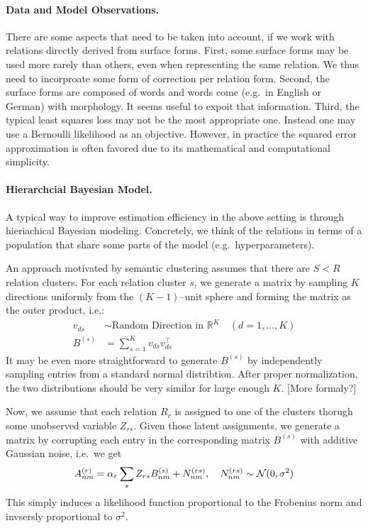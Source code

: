 \documentclass{article}
\renewcommand{\Re}{{\mathbb R}}
\begin{document}
\paragraph{Data and Model Observations.} There are some aspects that need to be taken into account, if we work with relations directly derived from surface forms. First, some surface forms may be used more rarely than others, even when representing the same relation. We thus need to incorproate some form of correction per relation form. Second, the surface forms are composed of words and words come (e.g.~in English or German) with morphology. It seems useful to expoit that information. Third, the typical least squares loss may not be the most appropriate one. Instead one may use a Bernoulli likelihood as an objective. However, in practice the squared error approximation is often favored due to its mathematical and computational simplicity. 

\paragraph{Hierarchcial Bayesian Model.} 

A typical way to improve estimation efficiency in the above setting is through hieriachical Bayesian modeling. Concretely, we think of the relations in terms of a population that share some parts of the model (e.g.~hyperparameters).  

An approach motivated by semantic clustering assumes that there are $S < R$ relation clusters. For each relation cluster $s$, we generate a matrix by sampling $K$ directions uniformly from the $(K-1)$--unit sphere and forming the matrix as the outer product, i.e.:
\begin{align}
v_{ds} & \sim \text{Random Direction in $\Re^K$} \quad (d=1,\dots,K) \\
B^{(s)} & = \sum_{s=1}^K v_{ds} v_{ds}^\top
\end{align}
It may be even more straightforward to generate $B^{(s)}$ by independently sampling entries from a standard normal distribtion. After proper normalization, the two distributions should be very similar for large enough $K$.  [More formaly?]

Now, we assume that each relation $R_r$ is assigned to one of the clusters thorugh some unobserved variable $Z_{rs}$. Given those latent assignments, we generate a matrix by corrupting each entry in the corresponding matrix $B^{(s)}$ with additive Gaussian noise, i.e.~we get 
\begin{align}
A^{(r)}_{nm} = \alpha_r \sum_s Z_{rs} B^{(s)}_{nm} + N^{(rs)}_{nm}, \quad N^{(rs)}_{nm} \sim {\cal N}(0,\sigma^2)
\end{align} 
This simply induces a likelihood function proportional to the Frobenius norm and invsersly proportional to $\sigma^2$. \\
\end{document}

